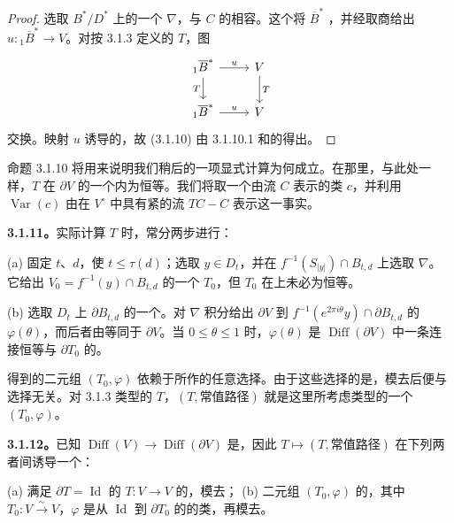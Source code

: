 \begin{proof}
选取 $B^*/D^*$ 上的一个 $\nabla$，与 $C$ 的相容。这个将 $\overline B^*$ ，并经取商给出 $u:{}_1\overline B^*\to V$。对按 3.1.3 定义的 $T$，图
\[
\begin{tikzcd}
 {}_1\overline B^*\arrow[r,"u"]\arrow[d,"T"']&V\arrow[d,"T"]\\
 {}_1\overline B^*\arrow[r,"u"]&V
\end{tikzcd}
\]
交换。映射 $u$ 诱导的，故 (3.1.10) 由 3.1.10.1 和的得出。
\end{proof}

命题 3.1.10 将用来说明我们稍后的一项显式计算为何成立。在那里，与此处一样，$T$ 在 $\partial V$ 的一个内为恒等。我们将取一个由流 $C$ 表示的类 $c$，并利用 $\operatorname{Var}(c)$ 由在 $V^\circ$ 中具有紧的流 $TC-C$ 表示这一事实。

\textbf{3.1.11。}实际计算 $T$ 时，常分两步进行：

(a) 固定 $t$、$d$，使 $t\leq\tau(d)$；选取 $y\in D_t$，并在 $f^{-1}(S_{|y|})\cap B_{t,d}$ 上选取 $\nabla$。它给出 $V_0=f^{-1}(y)\cap B_{t,d}$ 的一个 $T_0$，但 $T_0$ 在上未必为恒等。

(b) 选取 $D_t$ 上 $\partial B_{t,d}$ 的一个。对 $\nabla$ 积分给出 $\partial V$ 到 $f^{-1}(e^{2\pi i\theta}y)\cap\partial B_{t,d}$ 的 $\varphi(\theta)$，而后者由等同于 $\partial V$。当 $0\leq\theta\leq1$ 时，$\varphi(\theta)$ 是 $\operatorname{Diff}(\partial V)$ 中一条连接恒等与 $\partial T_0$ 的。

得到的二元组 $(T_0,\varphi)$ 依赖于所作的任意选择。由于这些选择的是，模去后便与选择无关。对 3.1.3 类型的 $T$，$(T,\text{常值路径})$ 就是这里所考虑类型的一个 $(T_0,\varphi)$。

\textbf{3.1.12。}已知 $\operatorname{Diff}(V)\to\operatorname{Diff}(\partial V)$ 是，因此 $T\mapsto(T,\text{常值路径})$ 在下列两者间诱导一个：

(a) 满足 $\partial T=\operatorname{Id}$ 的 $T:V\to V$ 的，模去；
(b) 二元组 $(T_0,\varphi)$ 的，其中 $T_0:V\xrightarrow{\sim}V$，$\varphi$ 是从 $\operatorname{Id}$ 到 $\partial T_0$ 的的类，再模去。

